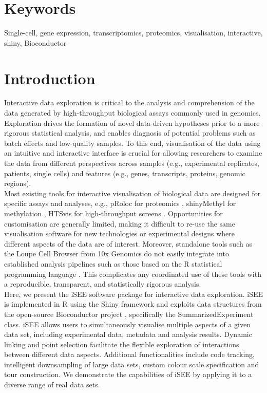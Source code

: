 \documentclass[10pt,a4paper,twocolumn]{article}
\begin{document}
\section*{Keywords}


Single-cell, gene expression, transcriptomics, proteomics, visualisation, interactive, shiny, Bioconductor


\clearpage

\section*{Introduction}
Interactive data exploration is critical to the analysis and comprehension of the data generated by high-throughput biological assays commonly used in genomics.
Exploration drives the formation of novel data-driven hypotheses prior to a more rigorous statistical analysis, and enables diagnosis of potential problems such as batch effects and low-quality samples.
To this end, visualisation of the data using an intuitive and interactive interface is crucial for allowing researchers to examine the data from different perspectives across samples (e.g., experimental replicates, patients, single cells) and features (e.g., genes, transcripts, proteins, genomic regions).\\

Most existing tools for interactive visualisation of biological data are designed for specific assays and analyses, e.g., pRoloc for proteomics \citep{gatto2014mass}, shinyMethyl for methylation \citep{fortin2014shinymethyl}, HTSvis for high-throughput screens \citep{scheeder2017htsvis}.
Opportunities for customisation are generally limited, making it difficult to re-use the same visualisation software for new technologies or experimental designs where different aspects of the data are of interest.
Moreover, standalone tools such as the Loupe Cell Browser from 10x Genomics \citep{zheng2017massively} do not easily integrate into established analysis pipelines such as those based on the R statistical programming language \citep{rcore2008R}.
This complicates any coordinated use of these tools with a reproducible, transparent, and statistically rigorous analysis.\\

Here, we present the iSEE software package for interactive data exploration.
iSEE is implemented in R using the Shiny framework \citep{chang2017shiny} and exploits data structures from the open-source Bioconductor project \citep{gentleman2004bioconductor}, specifically the SummarizedExperiment class.
iSEE allows users to simultaneously visualise multiple aspects of a given data set, including experimental data, metadata and analysis results.
Dynamic linking and point selection facilitate the flexible exploration of interactions between different data aspects.
Additional functionalities include code tracking, intelligent downsampling of large data sets, custom colour scale specification and tour construction.
We demonstrate the capabilities of iSEE by applying it to a diverse range of real data sets.
\end{document}
